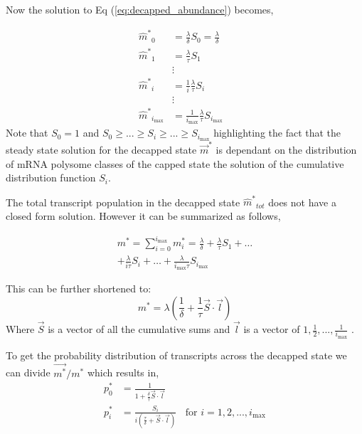 \documentclass[10pt,letterpaper]{article}
\newcommand{\imax}{\ensuremath{{i_{\max}}}\xspace}
\newcommand{\mhat}{\ensuremath{\hat{m}}\xspace}
\newcommand{\mhatstar}{\ensuremath{\mhat^{*}}\xspace}
\newcommand{\mvec}{\ensuremath{\vec{m}}\xspace}
\newcommand{\mvecstar}{\ensuremath{\mvec^*}\xspace}
\newcommand{\msumstar}{\ensuremath{m^*}\xspace}
\begin{document}
Now the solution to Eq (\ref{eq:decapped_abundance}) becomes,

\begin{align}
  \label{eq:decapped_solution} 
  \mhatstar_0  &= \frac{\lambda}{\delta}S_{0}=\frac{\lambda}{\delta} \nonumber \\
  \mhatstar_1  &= \frac{\lambda}{\tau}S_{1} \nonumber \\
               & \vdots &  \\
  \mhatstar_i  &= \frac{1}{i}\frac{\lambda}{\tau}S_{i}  \nonumber \\
               & \vdots & \nonumber \\
  \mhatstar_{\imax}  &= \frac{1}{\imax}\frac{\lambda}{\tau}S_{\imax}  \nonumber
\end{align}
Note that $S_{0}=1$ and $ S_{0} \ge ... \ge S_{i} \ge ... \ge S_{\imax}$ highlighting the fact that the steady state solution for the decapped state \mvecstar is dependant on the distribution of mRNA polysome classes of the capped state the solution of the cumulative distribution function $S_i$. %

The total transcript population in the decapped state $\mhatstar_{tot}$ does not have a closed form solution.
However it can be summarized as follows,


\begin{align*}
  \msumstar = \sum_{i=0}^{\imax} m_{i}^{*} = \frac{\lambda}{\delta} + \frac{\lambda}{\tau}S_{1}+ \hdots \\
  + \frac{\lambda}{i \tau}S_{i} + \hdots  + \frac{\lambda}{\imax \tau}S_{\imax} 
\end{align*}

This can be further shortened to:
\begin{equation} \label{eq: marked_total_pop}
  \msumstar = \lambda(\frac{1}{\delta} + \frac{1}{\tau}\vec{S} \cdot \vec{l}	) 
\end{equation}
Where $\vec{S}$ is a vector of all the cumulative sums and $\vec{l}$ is a vector of $1,\frac{1}{2},...,\frac{1}{\imax}$ . 


To get the probability distribution of transcripts across the decapped state we can divide $\vec{m^{*}}/\msumstar$ which results in,
\begin{align}\label{eq:decapped_distribution}
  p_{0}^{*} &= \frac{1}{1 + \frac{\delta}{\tau}\vec{S} \cdot \vec{l}}	\\
  p_{i}^{*} &= \frac{S_{i}}{i(\frac{\tau}{\delta} + \vec{S} \cdot \vec{l})}	\:\:\:\: \text{for } i=1, 2, ..., \imax
\end{align}
\end{document}
